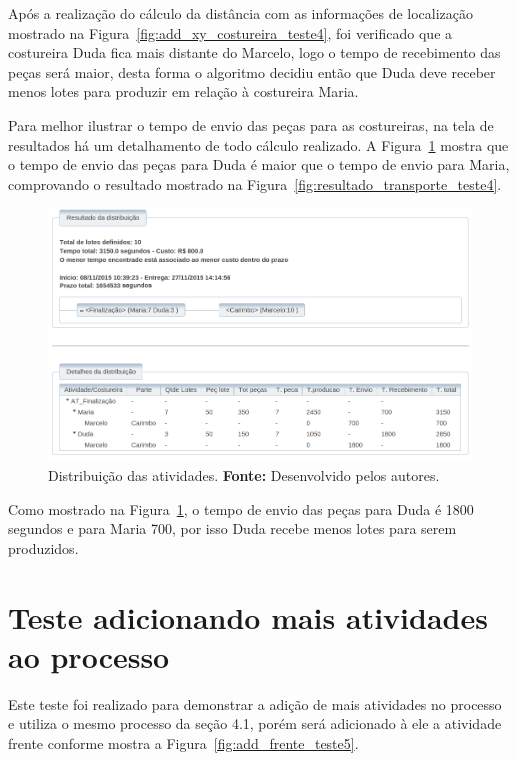 \par Após a realização do cálculo da distância com as informações de localização mostrado na Figura~\ref{fig:add_xy_costureira_teste4}, 
foi verificado que a costureira Duda fica mais distante do Marcelo, logo o tempo de recebimento das peças será maior, desta forma o 
algoritmo decidiu então que Duda deve receber menos lotes para produzir em relação à costureira Maria.

\par Para melhor ilustrar o tempo de envio das peças para as costureiras, na tela
de resultados há um detalhamento de todo cálculo realizado. A
Figura~\ref{fig:detalhameneto_transporte_teste4} mostra que o tempo de envio das peças para Duda é 
maior que o tempo de envio para Maria, comprovando o resultado mostrado na
Figura~\ref{fig:resultado_transporte_teste4}.

\begin{figure}[h!]
	\centerline{\includegraphics[width=13cm]{./imagens/detalhamento_transporte_teste4.png}}
	\caption[Distribuição das atividades.] 
	{Distribuição das atividades. \textbf{Fonte:} Desenvolvido pelos autores.}
	\label{fig:detalhameneto_transporte_teste4}
\end{figure}

\par Como mostrado na Figura~\ref{fig:detalhameneto_transporte_teste4}, o tempo
de envio das peças para Duda é 1800 segundos e para Maria 700, por isso
Duda recebe menos lotes para serem produzidos.


\section{Teste adicionando mais atividades ao processo}

\par Este teste foi realizado para demonstrar a adição de mais atividades no
processo e utiliza o mesmo processo da seção 4.1, porém será adicionado
à ele a atividade frente conforme mostra a Figura~\ref{fig:add_frente_teste5}.

